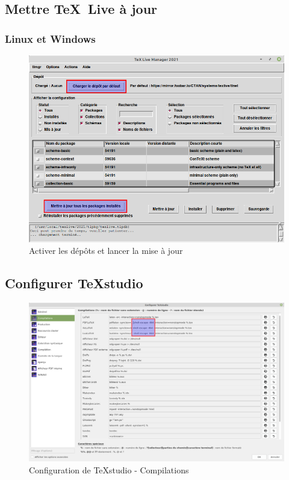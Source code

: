 \subsection{Mettre \TeX \ Live à jour}
\label{sec:majTl}


\subsubsection{Linux et Windows}

\begin{figure}[H]
	\centering
	\includegraphics[width=.75\linewidth]{captures/TL_manager_2021.png}
	\caption{Activer les dépôts et lancer la mise à jour}
	\label{fig:captureInstallTLManager}
\end{figure}


\subsection{Configurer TeXstudio}
\label{sec:configTeXstudio}

\begin{figure}[H]
	\centering
	\includegraphics[width=\linewidth]{captures/configurer_TeXstudio_compilations}
	\caption{Configuration de TeXstudio - Compilations}
	\label{fig:captureConfigTeXstudioCompilations}
\end{figure}


